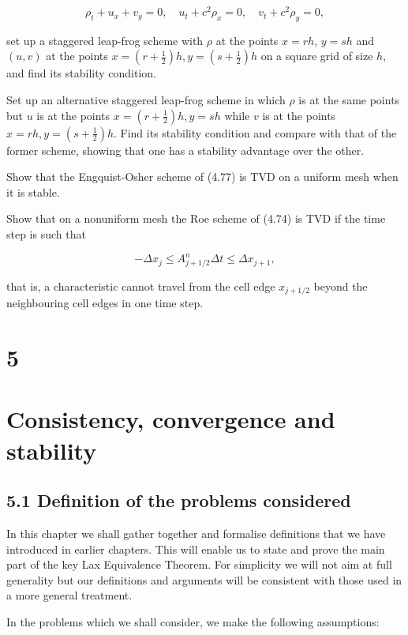 \documentclass[10pt]{article}
\begin{document}
\[
\rho_{t}+u_{x}+v_{y}=0, \quad u_{t}+c^{2} \rho_{x}=0, \quad v_{t}+c^{2} \rho_{y}=0,
\]

set up a staggered leap-frog scheme with \(\rho\) at the points \(x=r h\), \(y=s h\) and \((u, v)\) at the points \(x=\left(r+\frac{1}{2}\right) h, y=\left(s+\frac{1}{2}\right) h\) on a square grid of size \(h\), and find its stability condition.

Set up an alternative staggered leap-frog scheme in which \(\rho\) is at the same points but \(u\) is at the points \(x=\left(r+\frac{1}{2}\right) h, y=s h\) while \(v\) is at the points \(x=r h, y=\left(s+\frac{1}{2}\right) h\). Find its stability condition and compare with that of the former scheme, showing that one has a stability advantage over the other.

Show that the Engquist-Osher scheme of (4.77) is TVD on a uniform mesh when it is stable.

Show that on a nonuniform mesh the Roe scheme of (4.74) is TVD if the time step is such that

\[
-\Delta x_{j} \leq A_{j+1 / 2}^{n} \Delta t \leq \Delta x_{j+1},
\]

that is, a characteristic cannot travel from the cell edge \(x_{j+1 / 2}\) beyond the neighbouring cell edges in one time step.

\section*{5}
\section*{Consistency, convergence and stability}
\subsection*{5.1 Definition of the problems considered}
In this chapter we shall gather together and formalise definitions that we have introduced in earlier chapters. This will enable us to state and prove the main part of the key Lax Equivalence Theorem. For simplicity we will not aim at full generality but our definitions and arguments will be consistent with those used in a more general treatment.

In the problems which we shall consider, we make the following assumptions:
\end{document}
